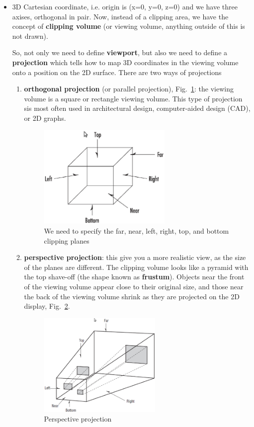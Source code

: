 \begin{itemize}
\item 3D Cartesian coordinate, i.e. origin is (x=0, y=0, z=0) and we
  have three axises, orthogonal in pair. Now, instead of a clipping
  area, we have the concept of {\bf clipping volume} (or viewing
  volume, anything outside of this is not drawn).

  So, not only we need to define {\bf viewport}, but also we need to
  define a {\bf projection} which tells how to map 3D coordinates in
  the viewing volume onto a position on the 2D surface. There are two
  ways of projections
  \begin{enumerate}
  \item {\bf orthogonal projection} (or parallel projection),
    Fig.~\ref{fig:orthogonal_projection}: the viewing volume is a
    square or rectangle viewing volume. This type of projection sis
    most often used in architectural design, computer-aided design
    (CAD), or 2D graphs.
\begin{figure}[hbt]
  \centerline{\includegraphics[height=5cm,
    angle=0]{./images/orthogonal_projection.eps}}
  \caption{We need to specify the far, near, left, right, top, and
    bottom clipping planes}
\label{fig:orthogonal_projection}
\end{figure}

\item {\bf perspective projection}: this give you a more realistic
  view, as the size of the planes are different. The clipping volume
  looks like a pyramid with the top shave-off (the shape known as
  {\bf frustum}). Objects near the front of the viewing volume appear
  close to their original size, and those near the back of the viewing
  volume shrink as they are projected on the 2D display,
  Fig.~\ref{fig:perspective_projection}.

\begin{figure}[hbt]
  \centerline{\includegraphics[height=5cm,
    angle=0]{./images/perspective_projection.eps}}
 \caption{Perspective projection}
\label{fig:perspective_projection}
\end{figure}

  \end{enumerate}


\end{itemize}

